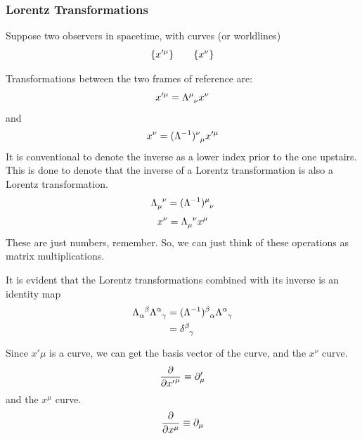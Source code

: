 		\newpage

	\subsubsection{Lorentz Transformations}
		\label{subsubsec:lorentz-transformations}

		Suppose two observers in spacetime, with curves (or worldlines)
		\[
			\qty{x'^\mu}\qquad \qty{x^\nu}
		\]

		Transformations between the two frames of reference are:
		\begin{equation}
			\label{eq:lorentz-transformation-idx}
			x'^\mu = \Lambda\indices{^\mu_\nu}x^\nu
		\end{equation}
		and
		\begin{equation}
			\label{eq:lorentz-inverse-transform}
			x^\nu  = (\Lambda\inv)\indices{^\nu_\mu} x'^\mu
		\end{equation}
		It is conventional to denote the inverse as a lower index prior to
		the one upstairs. This is done to denote that the inverse of a Lorentz transformation
		is also a Lorentz transformation.
		\[
			\Lambda\indices{_\mu^\nu}
			=
			(\Lambda\inv)\indices{^\mu_\nu}
		\]
		\[
			x^\nu  = \Lambda\indices{_\mu^\nu} x^\mu
		\]
		These are just numbers, remember. So, we can just think of these 
		operations as matrix multiplications.

		It is evident that the Lorentz transformations combined
		with its inverse is an identity map
		\begin{align*}
			\Lambda\indices{_\alpha^\beta}
			\Lambda\indices{^\alpha_\gamma}
			&=
			(\Lambda\inv)\indices{^\beta_\alpha}
			\Lambda\indices{^\alpha_\gamma}\\
			&=
			\delta\indices{^\beta_\gamma}
		\end{align*}

		Since $x'\mu$ is a curve, we can get the basis vector of the 
		curve, and the $x^\nu$ curve. 
		\[
			\pdv{}{{x'}^\mu} \equiv \partial'_\mu
		\]
		and the $x^\mu$ curve.
		\[
			\pdv{}{x^\mu} \equiv \partial_\mu 
		\]

